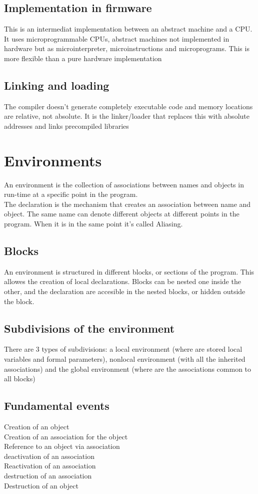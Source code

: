 \documentclass[12pt, a4paper]{article}
\begin{document}
\subsection{Implementation in firmware}
This is an intermediat implementation between an abstract machine and a CPU. It uses microprogrammable CPUs, abstract
machines not implemented in hardware but as microinterpreter, microinstructions and microprograms. This is more
flexible than a pure hardware implementation

\subsection{Linking and loading}
The compiler doesn't generate completely executable code and memory locations are relative, not absolute. It is
the linker/loader that replaces this with absolute addresses and links precompiled libraries

\newpage
\section{Environments}
An environment is the collection of associations between names and objects in run-time at a specific point in the
program.\\The declaration is the mechanism that creates an association between name and object. The same name can 
denote different objects at different points in the program. When it is in the same point it's called Aliasing.

\subsection{Blocks}
An environment is structured in different blocks, or sections of the program. This allowes the creation of local 
declarations. Blocks can be nested one inside the other, and the declaration are accesible in the nested blocks, or
hidden outside the block.

\subsection{Subdivisions of the environment}
There are 3 types of subdivisions: a local environment (where are stored local variables and formal parameters), 
nonlocal environment (with all the inherited associations) and the global environment (where are the associations 
common to all blocks)

\subsection{Fundamental events}
\begin{center}
    Creation of an object\\Creation of an association for the object\\Reference to an object via association\\
    deactivation of an association\\Reactivation of an association\\destruction of an association\\Destruction of an
    object
\end{center}
\end{document}
